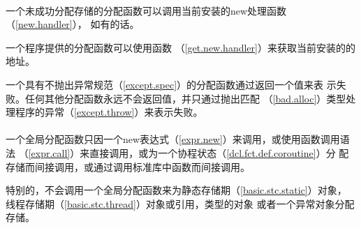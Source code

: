 \paragraph{} %
一个未成功分配存储的分配函数可以调用当前安装的new处理函数（\ref{new.handler}），
如有的话。

\begin{note}
  一个程序提供的分配函数可以使用函数
  （\ref{get.new.handler}）来获取当前安装的的地址。
\end{note}

一个具有不抛出异常规范（\ref{except.spec}）的分配函数通过返回一个\nullp{}值来表
示失败。任何其他分配函数永远不会返回\nullp{}值，并只通过抛出匹配
（\ref{bad.alloc}）类型处理程序的异常（\ref{except.throw}）来表示失败。

\paragraph{} %
一个全局分配函数只因一个new表达式（\ref{expr.new}）来调用，或使用函数调用语法
（\ref{expr.call}）来直接调用，或为一个协程状态（\ref{dcl.fct.def.coroutine}）分
配存储而间接调用，或通过调用\cpp{}标准库中函数而间接调用。

\begin{note}
  特别的，不会调用一个全局分配函数来为静态存储期（\ref{basic.stc.static}）对象，
  线程存储期（\ref{basic.stc.thread}）对象或引用，类型的对象
  或者一个异常对象分配存储。
\end{note}
